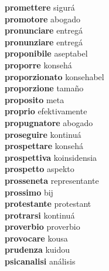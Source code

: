 \textbf{promettere } sigurá \\
\textbf{promotore } abogado \\
\textbf{pronunciare } entregá \\
\textbf{pronunziare } entregá \\
\textbf{proponibile } aseptabel \\
\textbf{proporre } konsehá \\
\textbf{proporzionato } konsehabel \\
\textbf{proporzione } tamaño \\
\textbf{proposito } meta \\
\textbf{proprio } efektivamente \\
\textbf{propugnatore } abogado \\
\textbf{proseguire } kontinuá \\
\textbf{prospettare } konsehá \\
\textbf{prospettiva } koinsidensia \\
\textbf{prospetto } aspekto \\
\textbf{prosseneta } representante \\
\textbf{prossimo } bij \\
\textbf{protestante } protestant \\
\textbf{protrarsi } kontinuá \\
\textbf{proverbio } proverbio \\
\textbf{provocare } kousa \\
\textbf{prudenza } kuidou \\
\textbf{psicanalisi } análisis \\
